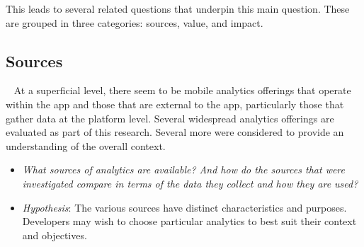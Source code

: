 This leads to several related questions that underpin this main question. These are grouped in three categories: sources, value, and impact.





\subsection{Sources}~\label{section-sources}
At a superficial level, there seem to be mobile analytics offerings that operate within the app and those that are external to the app, particularly those that gather data at the platform level. Several widespread analytics offerings are evaluated as part of this research. Several more were considered to provide an understanding of the overall context.
\begin{itemize}
    \item \emph{What sources of analytics are available? And how do the sources that were investigated compare in terms of the data they collect and how they are used?}
    \item \emph{Hypothesis}: The various sources have distinct characteristics and purposes. Developers may wish to choose particular analytics to best suit their context and objectives.
\end{itemize}

